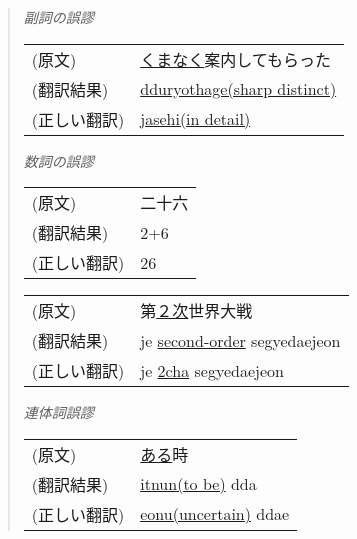 \begin{quote}
\vspace{0.5cm}

\begin{flushleft}
{\it 副詞の誤謬}
\end{flushleft}

\begin{tabular}{ll}
  (原文)      & \underline{くまなく}案内してもらった \\
  (翻訳結果)  & \underline{dduryothage(sharp distinct)} \\
  (正しい翻訳)& \underline{jasehi(in detail)} \\
\end{tabular}

\vspace{0.5cm}

\newpage

\begin{flushleft}
{\it 数詞の誤謬}
\end{flushleft}

\begin{tabular}{ll}
  (原文)      & 二十六 \\
  (翻訳結果)  & 2+6 \\
  (正しい翻訳)& 26 \\
\end{tabular}

\vspace{0.5cm}

\begin{tabular}{ll}
  (原文)      & 第\underline{２次}世界大戦 \\
  (翻訳結果)  & je \underline{second-order} segyedaejeon \\
  (正しい翻訳)& je \underline{2cha} segyedaejeon \\
\end{tabular}

\vspace{0.5cm}

\begin{flushleft}
{\it 連体詞誤謬}
\end{flushleft}

\begin{tabular}{ll}
  (原文)      & \underline{ある}時 \\
  (翻訳結果)  & \underline{itnun(to be)} dda \\
  (正しい翻訳)& \underline{eonu(uncertain)} ddae \\
\end{tabular}

\vspace{0.5cm}


\end{quote}
